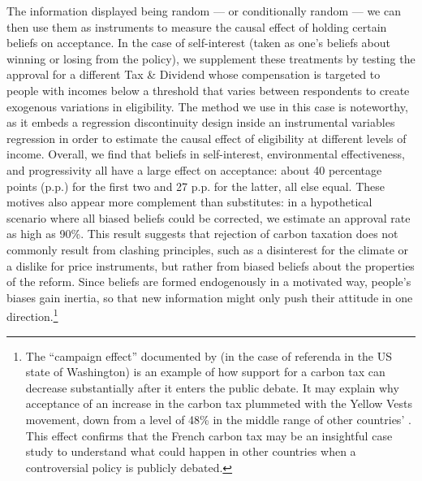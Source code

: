 \documentclass[11pt]{article}
\begin{document}
The information displayed being random --- or conditionally random --- we can then use them as instruments to measure the causal effect of holding certain beliefs on acceptance. In the case of self-interest (taken as one's beliefs about winning or losing from the policy), we supplement these treatments by testing the approval for a different Tax \& Dividend whose compensation is targeted to people with incomes below a threshold that varies between respondents to create exogenous variations in eligibility. The method we use in this case is noteworthy, as it embeds a regression discontinuity design inside an instrumental variables regression in order to estimate the causal effect of eligibility at different levels of income. Overall, we find that beliefs in self-interest, environmental effectiveness, and progressivity all have a large effect on acceptance: about 40 percentage points (p.p.) for the first two and 27 p.p. for the latter, all else equal. These motives also appear more complement than substitutes: in a hypothetical scenario where all biased beliefs could be corrected, we estimate an approval rate as high as 90\%. This result suggests that rejection of carbon taxation does not commonly result from clashing principles, such as a disinterest for the climate or a dislike for price instruments, but rather from biased beliefs about the properties of the reform. Since beliefs are formed endogenously in a motivated way, people's biases gain inertia, so that new information might only push their attitude in one direction.\footnote{The ``campaign effect'' documented by \citet{anderson_can_2019} (in the case of referenda in the US state of Washington) is an example of how support for a carbon tax can decrease substantially after it enters the public debate. It may explain why acceptance of an increase in the carbon tax plummeted with the Yellow Vests movement, down from a level of 48\% \citep{ademe_representations_2018} in the middle range of other countries' \citep{brechin_public_2010}. This effect confirms that the French carbon tax may be an insightful case study to understand what could happen in other countries when a controversial policy is publicly debated.}
\end{document}
